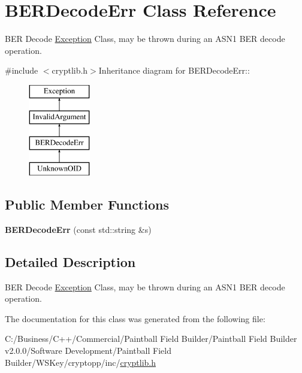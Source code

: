\hypertarget{class_b_e_r_decode_err}{
\section{BERDecodeErr Class Reference}
\label{class_b_e_r_decode_err}
}


BER Decode \hyperlink{class_exception}{Exception} Class, may be thrown during an ASN1 BER decode operation.  


{\ttfamily \#include $<$cryptlib.h$>$}Inheritance diagram for BERDecodeErr::\begin{figure}[H]
\begin{center}
\leavevmode
\includegraphics[height=4cm]{class_b_e_r_decode_err}
\end{center}
\end{figure}
\subsection*{Public Member Functions}
\begin{DoxyCompactItemize}
\item 
\hypertarget{class_b_e_r_decode_err_a19700ba11f5c1839499fa5ebb8eba8fc}{
{\bfseries BERDecodeErr} (const std::string \&s)}
\label{class_b_e_r_decode_err_a19700ba11f5c1839499fa5ebb8eba8fc}

\end{DoxyCompactItemize}


\subsection{Detailed Description}
BER Decode \hyperlink{class_exception}{Exception} Class, may be thrown during an ASN1 BER decode operation. 

The documentation for this class was generated from the following file:\begin{DoxyCompactItemize}
\item 
C:/Business/C++/Commercial/Paintball Field Builder/Paintball Field Builder v2.0.0/Software Development/Paintball Field Builder/WSKey/cryptopp/inc/\hyperlink{cryptlib_8h}{cryptlib.h}\end{DoxyCompactItemize}
